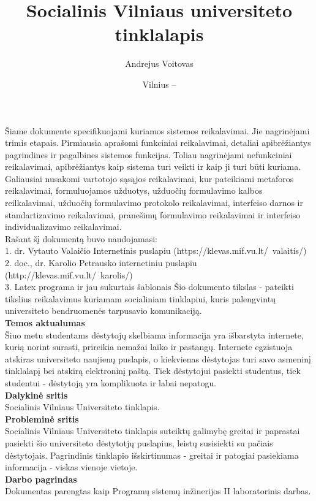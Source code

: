 \documentclass{VUMIFPSkursinis}
\title{Socialinis Vilniaus universiteto tinklalapis}
\author{Andrejus Voitovas}
\date{Vilnius – \the\year}
\begin{document}
\maketitle
\cleardoublepage{}
\setcounter{page}{2}
Šiame dokumente specifikuojami kuriamos sistemos reikalavimai. Jie nagrinėjami trimis etapais. Pirmiausia aprašomi funkciniai reikalavimai, detaliai apibrėžiantys pagrindines ir pagalbines sistemos funkcijas. Toliau nagrinėjami nefunkciniai reikalavimai, apibrėžiantys kaip sistema turi veikti ir kaip ji turi būti kuriama. Galiausiai nusakomi vartotojo sąsąjos reikalavimai, kur pateikiami metaforos reikalavimai, formuluojamos užduotys, užduočių formulavimo kalbos reilkalavimai, užduočių formulavimo protokolo reikalavimai, interfeiso darnos ir standartizavimo reikalavimai, pranešimų formulavimo reikalavimai ir interfeiso individualizavimo reikalavimai.
\\Rašant šį dokumentą buvo naudojamasi:
\\1. dr. Vytauto Valaičio Internetinis puslapiu (https://klevas.mif.vu.lt/~valaitis/)
\\2. doc., dr. Karolio Petrausko internetiniu puslapiu (http://klevas.mif.vu.lt/~karolis/)
\\3. Latex programa ir jau sukurtais šablonais
\newpage
\tableofcontents
{}
Šio dokumento tikslas - pateikti tikslius reikalavimus kuriamam socialiniam tinklapiui, kuris palengvintų universiteto bendruomenės tarpusavio komunikaciją.
\\\textbf{Temos aktualumas}
\\Šiuo metu studentams dėstytojų skelbiama informacija yra išbarstyta internete, kurią norint surasti, prireikia nemažai laiko ir pastangų. Internete egzistuoja atskiras universiteto naujienų puslapis, o kiekvienas dėstytojas turi savo asmeninį tinklalapį bei atskirą elektroninį paštą. Tiek dėstytojui pasiekti studentus, tiek studentui - dėstytoją yra komplikuota ir labai nepatogu.
\\\textbf{Dalykinė sritis}
\\Socialinis Vilniaus Universiteto tinklapis.
\\\textbf{Probleminė sritis} 
\\Socialinis Vilniaus Universiteto tinklapis suteiktų galimybę greitai ir paprastai pasiekti šio universiteto dėstytotjų puslapius, leistų susisiekti su pačiais dėstytojais. Pagrindinis tinklapio išskirtinumas - greitai ir patogiai pasiekiama informacija - viskas vienoje vietoje.
\\\textbf{Darbo pagrindas}
\\Dokumentas parengtas kaip Programų sistemų inžinerijos II laboratorinis darbas.
\end{document}
